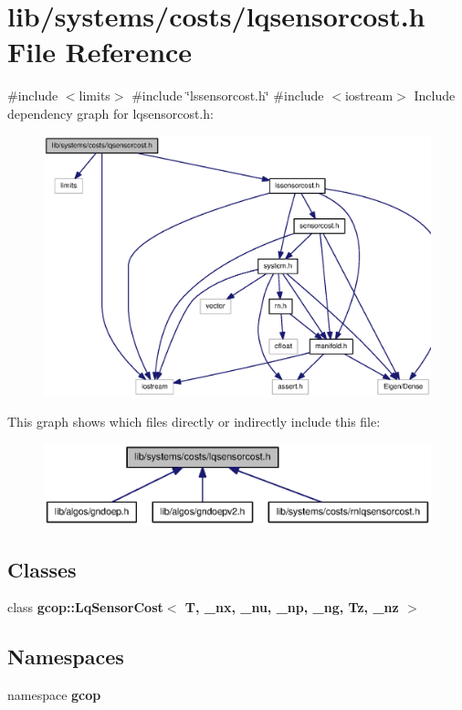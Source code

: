 \section{lib/systems/costs/lqsensorcost.h \-File \-Reference}
\label{lqsensorcost_8h}
{\ttfamily \#include $<$limits$>$}\*
{\ttfamily \#include \char`\"{}lssensorcost.\-h\char`\"{}}\*
{\ttfamily \#include $<$iostream$>$}\*
\-Include dependency graph for lqsensorcost.\-h\-:
\nopagebreak
\begin{figure}[H]
\begin{center}
\leavevmode
\includegraphics[width=350pt]{lqsensorcost_8h__incl}
\end{center}
\end{figure}
\-This graph shows which files directly or indirectly include this file\-:
\nopagebreak
\begin{figure}[H]
\begin{center}
\leavevmode
\includegraphics[width=350pt]{lqsensorcost_8h__dep__incl}
\end{center}
\end{figure}
\subsection*{\-Classes}
\begin{DoxyCompactItemize}
\item 
class {\bf gcop\-::\-Lq\-Sensor\-Cost$<$ T, \-\_\-nx, \-\_\-nu, \-\_\-np, \-\_\-ng, Tz, \-\_\-nz $>$}
\end{DoxyCompactItemize}
\subsection*{\-Namespaces}
\begin{DoxyCompactItemize}
\item 
namespace {\bf gcop}
\end{DoxyCompactItemize}
